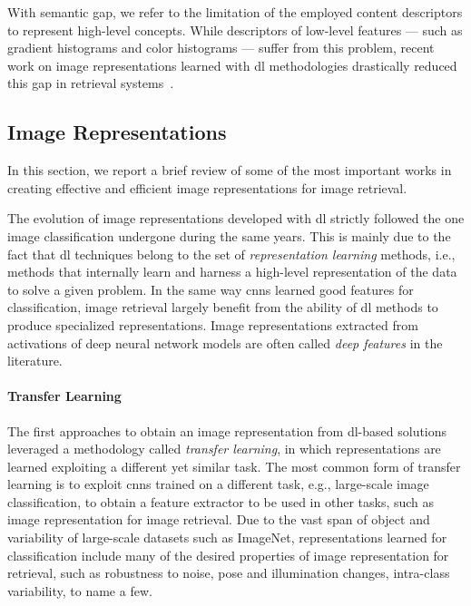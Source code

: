 With semantic gap, we refer to the limitation of the employed content descriptors to represent high-level concepts.
While descriptors of low-level features --- such as gradient histograms and color histograms --- suffer from this problem, recent work on image representations learned with \gls{dl} methodologies drastically reduced this gap in retrieval systems~\cite{donahue2014decaf,sharif2014cnn}.

\subsection{Image Representations}
In this section, we report a brief review of some of the most important works in creating effective and efficient image representations for image retrieval.

The evolution of image representations developed with \gls{dl} strictly followed the one image classification undergone during the same years.
This is mainly due to the fact that \acrlong{dl} techniques belong to the set of \emph{representation learning} methods, i.e., methods that internally learn and harness a high-level representation of the data to solve a given problem.
In the same way \glspl{cnn} learned good features for classification, image retrieval largely benefit from the ability of \gls{dl} methods to produce specialized representations.
Image representations extracted from activations of deep neural network models are often called \emph{deep features} in the literature.

\paragraph{Transfer Learning}
The first approaches to obtain an image representation from \gls{dl}-based solutions leveraged a methodology called \emph{transfer learning}, in which representations are learned exploiting a different yet similar task.
The most common form of transfer learning is to exploit \glspl{cnn} trained on a different task, e.g., large-scale image classification, to obtain a feature extractor to be used in other tasks, such as image representation for image retrieval.
Due to the vast span of object and variability of large-scale datasets such as ImageNet, representations learned for classification include many of the desired properties of image representation for retrieval, such as robustness to noise, pose and illumination changes, intra-class variability, to name a few.

